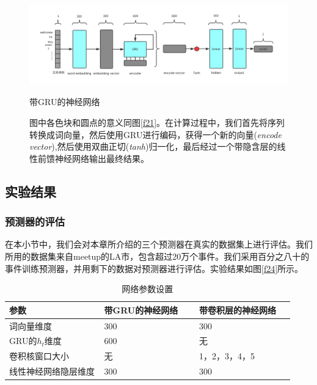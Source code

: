 \documentclass[12pt]{template}
\begin{document}
\begin{figure}[htb]
    \centering
    \includegraphics[width=16cm]{gru_ranker.png}
    \caption{带GRU的神经网络}
    \captionsetup{font=footnotesize,margin=30pt}\caption*{图中各色块和圆点的意义同图\ref{f21}。在计算过程中，我们首先将序列转换成词向量，然后使用GRU进行编码，获得一个新的向量(\textit{encode vector}),然后使用双曲正切(\textit{tanh})归一化，最后经过一个带隐含层的线性前馈神经网络输出最终结果。}
    \label{f23}
\end{figure}

\subsection{实验结果}
\subsubsection{预测器的评估}
在本小节中，我们会对本章所介绍的三个预测器在真实的数据集上进行评估。我们所用的数据集来自meetup的LA市，包含超过20万个事件。我们采用百分之八十的事件训练预测器，并用剩下的数据对预测器进行评估。实验结果如图\ref{f24}所示。

\begin{table}[htb]
\caption{\label{t21}网络参数设置}
\centering
\begin{tabular*}{\linewidth}{p{0.333\linewidth}p{0.333\linewidth}p{0.333\linewidth}}
\toprule
    参数         & 带GRU的神经网络 & 带卷积层的神经网络 \\
\midrule
    词向量维度      & 300       & 300       \\
    GRU的\(h_t\)维度   & 600       & 无         \\
    卷积核窗口大小    & 无         & 1，2，3，4，5 \\
    线性神经网络隐层维度 & 300       & 300      \\ 
\bottomrule
\end{tabular*}
\end{table}
\end{document}

